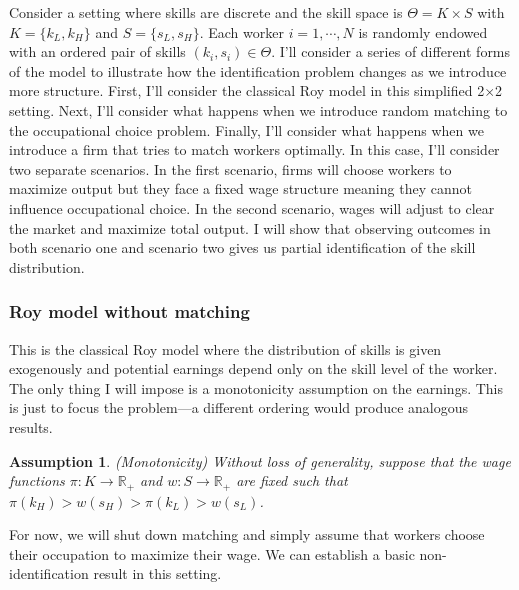 \documentclass[12 pt]{article}
\newtheorem{assumption}{Assumption} %
\begin{document}
Consider a setting where skills are discrete and the skill space is $\Theta = K \times S$ with $K=\{k_L,k_H\}$ and $S=\{s_L,s_H\}$. Each worker $i=1,\cdots,N$ is randomly endowed with an ordered pair of skills $(k_i,s_i)\in\Theta$. I'll consider a series of different forms of the model to illustrate how the identification problem changes as we introduce more structure. First, I'll consider the classical Roy model in this simplified 2$\times$2 setting. Next, I'll consider what happens when we introduce random matching to the occupational choice problem. Finally, I'll consider what happens when we introduce a firm that tries to match workers optimally. In this case, I'll consider two separate scenarios. In the first scenario, firms will choose workers to maximize output but they face a fixed wage structure meaning they cannot influence occupational choice. In the second scenario, wages will adjust to clear the market and maximize total output. I will show that observing outcomes in both scenario one and scenario two gives us partial identification of the skill distribution.

\subsubsection{Roy model without matching}

This is the classical Roy model where the distribution of skills is given exogenously and potential earnings depend only on the skill level of the worker. The only thing I will impose is a monotonicity assumption on the earnings. This is just to focus the problem---a different ordering would produce analogous results.

\begin{assumption}(Monotonicity)
	Without loss of generality, suppose that the wage functions $\pi:K\to\mathbb{R}_+$ and $w:S\to\mathbb{R}_+$ are fixed such that $\pi(k_H) > w(s_H) > \pi(k_L) > w(s_L)$.
	\label{ass:mono}
\end{assumption}

For now, we will shut down matching and simply assume that workers choose their occupation to maximize their wage. We can establish a basic non-identification result in this setting.
\end{document}
